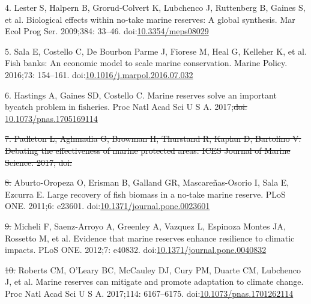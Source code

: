 \documentclass[12pt,]{article}
\providecommand{\DIFaddtex}[1]{{\protect\color{blue}\uwave{#1}}} %
\providecommand{\DIFdeltex}[1]{{\protect\color{red}\sout{#1}}}                      %
\providecommand{\DIFaddbegin}{} %
\providecommand{\DIFaddend}{} %
\providecommand{\DIFdelbegin}{} %
\providecommand{\DIFdelend}{} %
\providecommand{\DIFadd}[1]{\texorpdfstring{\DIFaddtex{#1}}{#1}} %
\providecommand{\DIFdel}[1]{\texorpdfstring{\DIFdeltex{#1}}{}} %
\newcommand{\DIFscaledelfig}{0.5}
\newlength{\DIFdelgraphicswidth} %
\newlength{\DIFdelgraphicsheight} %
\newcommand{\DIFaddincludegraphics}[2][]{{\color{blue}\fbox{\DIFOincludegraphics[#1]{#2}}}} %
\newcommand{\DIFdelincludegraphics}[2][]{%
\sbox{\DIFdelgraphicsbox}{\DIFOincludegraphics[#1]{#2}}%
\settoboxwidth{\DIFdelgraphicswidth}{\DIFdelgraphicsbox} %
\settoboxtotalheight{\DIFdelgraphicsheight}{\DIFdelgraphicsbox} %
\scalebox{\DIFscaledelfig}{%
\parbox[b]{\DIFdelgraphicswidth}{\usebox{\DIFdelgraphicsbox}\\[-\baselineskip] \rule{\DIFdelgraphicswidth}{0em}}\llap{\resizebox{\DIFdelgraphicswidth}{\DIFdelgraphicsheight}{%
\setlength{\unitlength}{\DIFdelgraphicswidth}%
\begin{picture}(1,1)%
\thicklines\linethickness{2pt} %
{\color[rgb]{1,0,0}\put(0,0){\framebox(1,1){}}}%
{\color[rgb]{1,0,0}\put(0,0){\line( 1,1){1}}}%
{\color[rgb]{1,0,0}\put(0,1){\line(1,-1){1}}}%
\end{picture}%
}\hspace*{3pt}}} %
} %
\DeclareRobustCommand{\DIFaddbegin}{\DIFOaddbegin \let\includegraphics\DIFaddincludegraphics} %
\DeclareRobustCommand{\DIFaddend}{\DIFOaddend \let\includegraphics\DIFOincludegraphics} %
\DeclareRobustCommand{\DIFdelbegin}{\DIFOdelbegin \let\includegraphics\DIFdelincludegraphics} %
\DeclareRobustCommand{\DIFdelend}{\DIFOaddend \let\includegraphics\DIFOincludegraphics} %
\begin{document}
\hypertarget{ref-lester_2009-Ks}{}
4. Lester S, Halpern B, Grorud-Colvert K, Lubchenco J, Ruttenberg B,
Gaines S, et al. Biological effects within no-take marine reserves: A
global synthesis. Mar Ecol Prog Ser. 2009;384: 33--46.
doi:\href{https://doi.org/10.3354/meps08029}{10.3354/meps08029}

\hypertarget{ref-sala_2016-PV}{}
5. Sala E, Costello C, De Bourbon Parme J, Fiorese M, Heal G, Kelleher
K, et al. Fish banks: An economic model to scale marine conservation.
Marine Policy. 2016;73: 154--161.
doi:\href{https://doi.org/10.1016/j.marpol.2016.07.032}{10.1016/j.marpol.2016.07.032}

\hypertarget{ref-hastings_2017-sm}{}
6. Hastings A, Gaines SD, Costello C. Marine reserves solve an important
bycatch problem in fisheries. Proc Natl Acad Sci U S A. 2017;\DIFdelbegin \DIFdel{doi:
}\DIFdelend \DIFaddbegin \DIFadd{114:
8927--8934.
doi:}\DIFaddend \href{https://doi.org/10.1073/pnas.1705169114}{10.1073/pnas.1705169114}

\DIFdelbegin %
\DIFdel{7. Padleton L, Aghmadia G, Browman H, Thurstand R, Kaplan D, Bartolino
V.
Debating the effectiveness of marine protected areas. ICES Journal of
Marine Science. 2017;
doi:}%

\DIFdelend \hypertarget{ref-aburtooropeza_2011-ya}{}
\DIFdelbegin \DIFdel{8. }\DIFdelend \DIFaddbegin \DIFadd{7. }\DIFaddend Aburto-Oropeza O, Erisman B, Galland GR, Mascareñas-Osorio I, Sala E,
Ezcurra E. Large recovery of fish biomass in a no-take marine reserve.
PLoS ONE. 2011;6: e23601.
doi:\href{https://doi.org/10.1371/journal.pone.0023601}{10.1371/journal.pone.0023601}

\hypertarget{ref-micheli_2012-EU}{}
\DIFdelbegin \DIFdel{9. }\DIFdelend \DIFaddbegin \DIFadd{8. }\DIFaddend Micheli F, Saenz-Arroyo A, Greenley A, Vazquez L, Espinoza Montes JA,
Rossetto M, et al. Evidence that marine reserves enhance resilience to
climatic impacts. PLoS ONE. 2012;7: e40832.
doi:\href{https://doi.org/10.1371/journal.pone.0040832}{10.1371/journal.pone.0040832}

\hypertarget{ref-roberts_2017-J9}{}
\DIFdelbegin \DIFdel{10. }\DIFdelend \DIFaddbegin \DIFadd{9. }\DIFaddend Roberts CM, O'Leary BC, McCauley DJ, Cury PM, Duarte CM, Lubchenco J,
et al. Marine reserves can mitigate and promote adaptation to climate
change. Proc Natl Acad Sci U S A. 2017;114: 6167--6175.
doi:\href{https://doi.org/10.1073/pnas.1701262114}{10.1073/pnas.1701262114}
\end{document}
